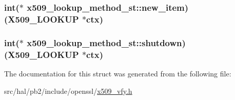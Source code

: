 \subsubsection[{\texorpdfstring{new\+\_\+item}{new_item}}]{\setlength{\rightskip}{0pt plus 5cm}int($\ast$ x509\+\_\+lookup\+\_\+method\+\_\+st\+::new\+\_\+item) ({\bf X509\+\_\+\+L\+O\+O\+K\+UP} $\ast$ctx)}\hypertarget{structx509__lookup__method__st_a308b007d8cb1b10bc525d9a8a794926e}{}\label{structx509__lookup__method__st_a308b007d8cb1b10bc525d9a8a794926e}
\subsubsection[{\texorpdfstring{shutdown}{shutdown}}]{\setlength{\rightskip}{0pt plus 5cm}int($\ast$ x509\+\_\+lookup\+\_\+method\+\_\+st\+::shutdown) ({\bf X509\+\_\+\+L\+O\+O\+K\+UP} $\ast$ctx)}\hypertarget{structx509__lookup__method__st_aa201108d16466a85c87dd0b86288087a}{}\label{structx509__lookup__method__st_aa201108d16466a85c87dd0b86288087a}


The documentation for this struct was generated from the following file\+:\begin{DoxyCompactItemize}
\item 
src/hal/pb2/include/openssl/\hyperlink{x509__vfy_8h}{x509\+\_\+vfy.\+h}\end{DoxyCompactItemize}
